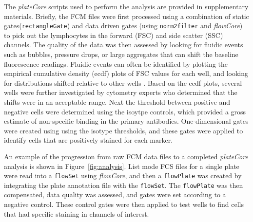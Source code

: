 \documentclass[12pt]{article}
\newcommand{\Robject}[1]{{\texttt{#1}}}
\newcommand{\Rpackage}[1]{{\textit{#1}}}
\begin{document}
The \Rpackage{plateCore}
scripts used to perform the analysis are provided in supplementary materials.
Briefly, the FCM files were first processed using a combination of static
gates(\Robject{rectangleGate}) and data driven gates (using
\Robject{norm2filter} and \Rpackage{flowCore}) to pick out the lymphocytes in
the forward (FSC) and side scatter (SSC) channels.  The
quality of the data was then assessed by looking for fluidic events such as
bubbles, pressure drops, or large aggregates that can shift the baseline
fluorescence readings. Fluidic events can often be identified by plotting the
empirical cumulative density (ecdf) plots of FSC values for each well, and
looking for distributions shifted relative to other wells \citep{lemeur2007}.
Based on the ecdf plots, several wells were further investigated by cytometry
experts who determined that the shifts were in an acceptable range. Next the
threshold between positive and negative cells were determined using the isoytpe
controls, which provided a gross estimate of non-specific binding in the
primary antibodies. One-dimensional gates were created using using the isotype
thresholds, and these gates were applied to identify cells that are positively
stained for each marker.

An example of the progression from raw FCM data files to a completed
\Rpackage{plateCore} analysis is shown in Figure~\ref{fig:analysis}. List mode
FCS files for a single plate were read into a \Robject{flowSet} using
\Rpackage{flowCore}, and then a \Robject{flowPlate} was created by integrating
the plate annotation file with the \Robject{flowSet}. The \Robject{flowPlate}
was then compensated, data quality was assessed, and gates were set according
to a negative control. These control gates were then applied to test wells to
find cells that had specific staining in channels of interest.
\end{document}
